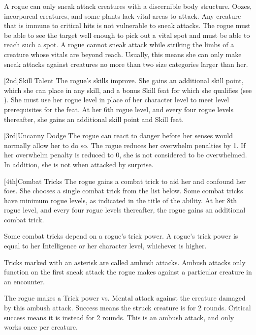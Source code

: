        A rogue can only sneak attack creatures with a discernible body structure.
        Oozes, incorporeal creatures, and some plants lack vital areas to attack.
        Any creature that is immune to critical hits is not vulnerable to sneak attacks.
        The rogue must be able to see the target well enough to pick out a vital spot and must be able to reach such a spot.
        A rogue cannot sneak attack while striking the limbs of a creature whose vitals are beyond reach.
        Usually, this means she can only make sneak attacks against creatures no more than two size categories larger than her.

        [2nd]{Skill Talent}
        The rogue's skills improve.
        She gains an additional skill point, which she can place in any skill, and a bonus Skill feat for which she qualifies (see ).
        She must use her rogue level in place of her character level to meet level prerequisites for the feat.
        At her 6th rogue level, and every four rogue levels thereafter, she gains an additional skill point and Skill feat.

        [3rd]{Uncanny Dodge}
        The rogue can react to danger before her senses would normally allow her to do so.
        The rogue reduces her overwhelm penalties by 1.
        If her overwhelm penalty is reduced to 0, she is not considered to be overwhelmed.
        In addition, she is not \unaware when attacked by surprise.

        [4th]{Combat Tricks}
        The rogue gains a combat trick to aid her and confound her foes.
        She chooses a single combat trick from the list below.
        Some combat tricks have minimum rogue levels, as indicated in the title of the ability.
        At her 8th rogue level, and every four rogue levels thereafter, the rogue gains an additional combat trick.

        Some combat tricks depend on a rogue's trick power.
        A rogue's trick power is equal to her Intelligence or her character level, whichever is higher.

        Tricks marked with an asterisk are called ambush attacks.
        Ambush attacks only function on the first sneak attack the rogue makes against a particular creature in an encounter.

        The rogue makes a Trick power vs. Mental attack against the creature damaged by this ambush attack.
        Success means the struck creature is \dazed for 2 rounds.
        Critical success means it is instead \confused for 2 rounds.
        This is an ambush attack, and only works once per creature.


